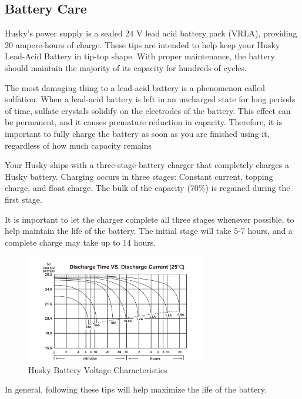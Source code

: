 \documentclass[]{clearpath-latex/clearpath-manual}
\begin{document}
\subsection{Battery Care}
Husky’s power supply is a sealed 24 V lead acid battery pack (VRLA), providing 20 ampere-hours of charge. These tips are 
intended to help keep your Husky Lead-Acid Battery in tip-top shape.  With proper maintenance, the battery should 
maintain the majority of its capacity for hundreds of cycles.

The most damaging thing to a lead-acid battery is a phenomenon called sulfation.  
When a lead-acid battery is left in an uncharged state for long periods of time, 
sulfate crystals solidify on the electrodes of the battery.  This effect can be permanent, 
and it causes premature reduction in capacity.  Therefore, it is important to fully charge 
the battery as soon as you are finished using it, regardless of how much capacity remains

Your Husky ships with a three-stage battery charger that completely charges a Husky battery.  
Charging occurs in three stages: Constant current, topping charge, and float charge.  
The bulk of the capacity (70\%) is regained during the first stage.

It is important to let the charger complete all three stages whenever possible, 
to help maintain the life of the battery.  The initial stage will take 5-7 hours,
and a complete charge may take up to 14 hours.

\begin{figure}[h]
	\centering
	\includegraphics[width=0.7\textwidth]{battery-chart.png}
	\caption{Husky Battery Voltage Characteristics}
	\label{battery-chart}
\end{figure}

In general, following these tips will help maximize the life of the battery.
\end{document}
